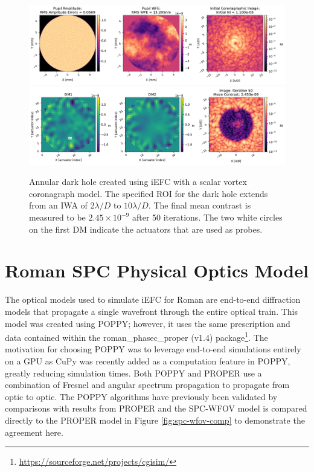\documentclass[12pt]{spieman}  %
\begin{document}
\begin{spacing}{2}
\begin{figure}[h]
    \centering
    \includegraphics[scale=0.45]{figs-general/hcipy_svc_initial_state.pdf}
    \includegraphics[scale=0.45]{figs-general/hcipy_svc_dark_hole.pdf}
    \caption{Annular dark hole created using iEFC with a scalar vortex coronagraph model. The specified ROI for the dark hole extends from an IWA of 2$\lambda/D$ to $10\lambda/D$. The final mean contrast is measured to be $2.45\times10^{-9}$ after 50 iterations. The two white circles on the first DM indicate the actuators that are used as probes.}
    \label{fig:iefc-2dm-annular-dark-hole}
\end{figure}


\section{Roman SPC Physical Optics Model}
\label{sec:roman-pom}
The optical models used to simulate iEFC for Roman are end-to-end diffraction models that propagate a single wavefront through the entire optical train. This model was created using POPPY\cite{perrin-poppy-2017}; however, it uses the same prescription and data contained within the roman\_phasec\_proper (v1.4) package\footnote{\href{https://sourceforge.net/projects/cgisim/}{https://sourceforge.net/projects/cgisim/}}. The motivation for choosing POPPY was to leverage end-to-end simulations entirely on a GPU as CuPy\cite{cupy_learningsys2017} was recently added as a computation feature in POPPY, greatly reducing simulation times. Both POPPY and PROPER\cite{krist-proper} use a combination of Fresnel and angular spectrum propagation to propagate from optic to optic. The POPPY algorithms have previously been validated by comparisons with results from PROPER\cite{} and the SPC-WFOV model is compared directly to the PROPER model in Figure \ref{fig:spc-wfov-comp} to demonstrate the agreement here. 


\end{spacing}
\end{document}
